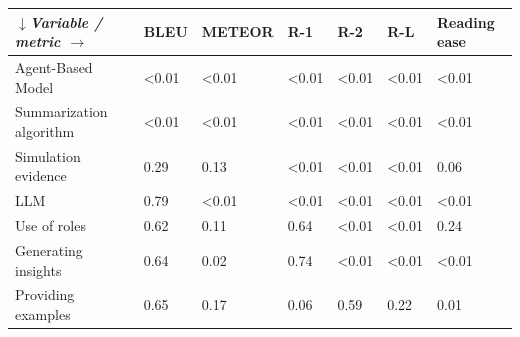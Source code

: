 \begin{tabular}{|l|l|l|l|l|l|l|}
\hline
\textit{$\downarrow$Variable / metric $\rightarrow$} & BLEU & METEOR & R-1 & R-2 & R-L & Reading ease \\
 \hline
 Agent-Based Model & \textless{}0.01 & \textless{}0.01 & \textless{}0.01 & \textless{}0.01 & \textless{}0.01 & \textless{}0.01 \\
 \hline
 Summarization algorithm & \textless{}0.01 & \textless{}0.01 & \textless{}0.01 & \textless{}0.01 & \textless{}0.01 & \textless{}0.01 \\
 \hline
 Simulation evidence & 0.29 & 0.13 & \textless{}0.01 & \textless{}0.01 & \textless{}0.01 & 0.06 \\
 \hline
 LLM & 0.79 & \textless{}0.01 & \textless{}0.01 & \textless{}0.01 & \textless{}0.01 & \textless{}0.01 \\
 \hline
 Use of roles & 0.62 & 0.11 & 0.64 & \textless{}0.01 & \textless{}0.01 & 0.24 \\
 \hline
 Generating insights & 0.64 & 0.02 & 0.74 & \textless{}0.01 & \textless{}0.01 & \textless{}0.01 \\
 \hline
 Providing examples & 0.65 & 0.17 & 0.06 & 0.59 & 0.22 & 0.01 \\
\hline
\end{tabular}
